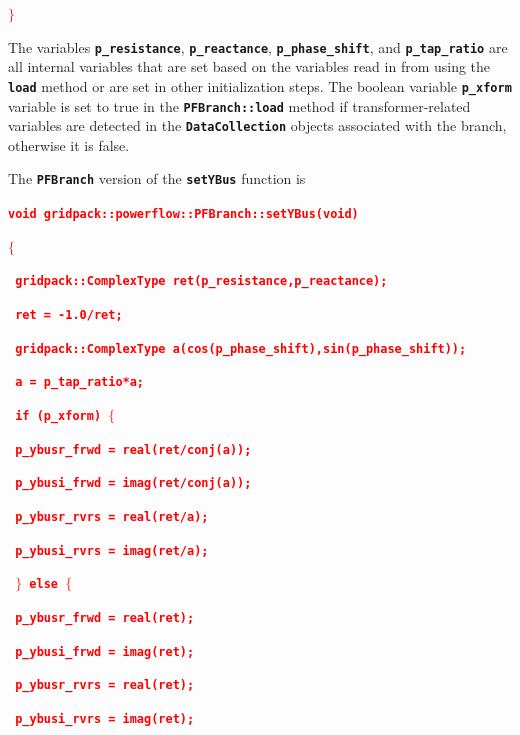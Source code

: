\documentclass[12pt]{report} %
\begin{document}
\textcolor{red}{\texttt{\textbf{$\boldsymbol{\mathrm{\}}}$}}}

The variables \texttt{\textbf{p\_resistance}}, \texttt{\textbf{p\_reactance}}, \texttt{\textbf{p\_phase\_shift}}, and \texttt{\textbf{p\_tap\_ratio}} are all internal variables that are set based on the variables read in from using the \texttt{\textbf{load}} method or are set in other initialization steps. The boolean variable \texttt{\textbf{p\_xform}} variable is set to true in the \texttt{\textbf{PFBranch::load}} method if transformer-related variables are detected in the \texttt{\textbf{DataCollection}} objects associated with the branch, otherwise it is false.

The \texttt{\textbf{PFBranch}} version of the \texttt{\textbf{setYBus}} function is

\textcolor{red}{\texttt{\textbf{void gridpack::powerflow::PFBranch::setYBus(void)}}}

\textcolor{red}{\texttt{\textbf{$\boldsymbol{\mathrm{\{}}$}}}

\textcolor{red}{\texttt{\textbf{  gridpack::ComplexType ret(p\_resistance,p\_reactance);}}}

\textcolor{red}{\texttt{\textbf{  ret = -1.0/ret;}}}

\textcolor{red}{\texttt{\textbf{  gridpack::ComplexType a(cos(p\_phase\_shift),sin(p\_phase\_shift));}}}

\textcolor{red}{\texttt{\textbf{  a = p\_tap\_ratio*a;}}}

\textcolor{red}{\texttt{\textbf{  if (p\_xform) $\boldsymbol{\mathrm{\{}}$}}}

\textcolor{red}{\texttt{\textbf{    p\_ybusr\_frwd = real(ret/conj(a));}}}

\textcolor{red}{\texttt{\textbf{    p\_ybusi\_frwd = imag(ret/conj(a));}}}

\textcolor{red}{\texttt{\textbf{    p\_ybusr\_rvrs = real(ret/a);}}}

\textcolor{red}{\texttt{\textbf{    p\_ybusi\_rvrs = imag(ret/a);}}}

\textcolor{red}{\texttt{\textbf{  $\boldsymbol{\mathrm{\}}}$ else $\boldsymbol{\mathrm{\{}}$}}}

\textcolor{red}{\texttt{\textbf{    p\_ybusr\_frwd = real(ret);}}}

\textcolor{red}{\texttt{\textbf{    p\_ybusi\_frwd = imag(ret);}}}

\textcolor{red}{\texttt{\textbf{    p\_ybusr\_rvrs = real(ret);}}}

\textcolor{red}{\texttt{\textbf{    p\_ybusi\_rvrs = imag(ret);}}}
\end{document}
